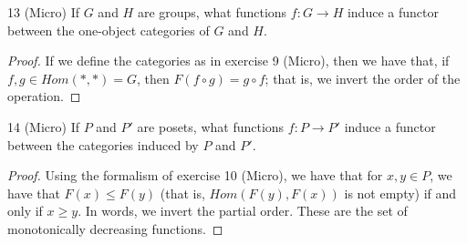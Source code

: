 \begin{exercise}{13 (Micro)}
If $G$ and $H$ are groups, what functions $f : G \to H$ induce a functor between the one-object categories of $G$ and $H$.
\end{exercise}
\begin{proof}
If we define the categories as in exercise 9 (Micro), then we have that, if $f, g \in Hom(\ast, \ast) = G$, then $F(f \circ g) = g \circ f$;
that is, we invert the order of the operation.
\end{proof} 

\begin{exercise}{14 (Micro)}
If $P$ and $P'$ are posets, what functions $f: P \to P'$ induce a functor between the categories induced by $P$ and $P'$.
\end{exercise}
\begin{proof}
Using the formalism of exercise 10 (Micro), we have that for $x, y \in P$, we have that $F(x) \leq F(y)$ (that is, $Hom(F(y), F(x))$ is not empty) if and only if $x \geq y$.
In words, we invert the partial order.
These are the set of monotonically decreasing functions.
\end{proof} 
